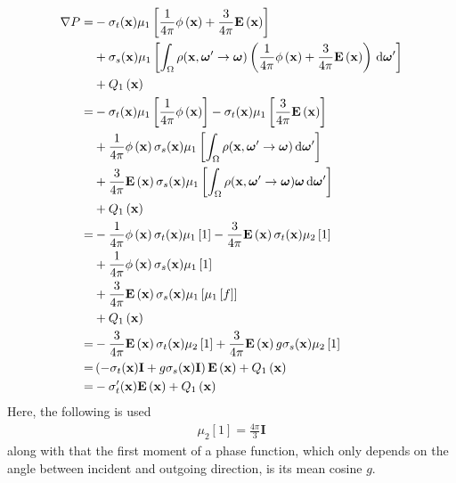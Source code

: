 \begin{align*}
\nabla P =&
-\sigma_t(\boldsymbol{\mathbf{x}})\mu_1\left[\frac{1}{4\pi}\phi\left(\boldsymbol{\mathbf{x}}\right) + \frac{3}{4\pi}\boldsymbol{\mathbf{E}}\left(\boldsymbol{\mathbf{x}}\right)\right]
\\&
+\sigma_s(\boldsymbol{\mathbf{x}})\mu_1\left[\int_{\Omega}\rho(\boldsymbol{\mathbf{x}}, \boldsymbol{\mathbf{\omega}}'\rightarrow\boldsymbol{\mathbf{\omega}})\left(\frac{1}{4\pi}\phi\left(\boldsymbol{\mathbf{x}}\right) + \frac{3}{4\pi}\boldsymbol{\mathbf{E}}\left(\boldsymbol{\mathbf{x}}\right)\right)\,\mathrm{d}\boldsymbol{\mathbf{\omega}}'\right]
\\&
\nonumber
+ Q_1\left(\boldsymbol{\mathbf{x}}\right)
\\
=&
-\sigma_t(\boldsymbol{\mathbf{x}})\mu_1\left[\frac{1}{4\pi}\phi\left(\boldsymbol{\mathbf{x}}\right)\right]
-\sigma_t(\boldsymbol{\mathbf{x}})\mu_1\left[\frac{3}{4\pi}\boldsymbol{\mathbf{E}}\left(\boldsymbol{\mathbf{x}}\right)\right]
\\
&
+\frac{1}{4\pi}\phi\left(\boldsymbol{\mathbf{x}}\right)\sigma_s(\boldsymbol{\mathbf{x}})\mu_1\left[\int_{\Omega}\rho(\boldsymbol{\mathbf{x}}, \boldsymbol{\mathbf{\omega}}'\rightarrow\boldsymbol{\mathbf{\omega}})\,\mathrm{d}\boldsymbol{\mathbf{\omega}}'\right]
\\
&
+\frac{3}{4\pi}\boldsymbol{\mathbf{E}}\left(\boldsymbol{\mathbf{x}}\right)\sigma_s(\boldsymbol{\mathbf{x}})\mu_1\left[\int_{\Omega}\rho(\boldsymbol{\mathbf{x}}, \boldsymbol{\mathbf{\omega}}'\rightarrow\boldsymbol{\mathbf{\omega}})\boldsymbol{\mathbf{\omega}}\,\mathrm{d}\boldsymbol{\mathbf{\omega}}'\right]
\\
&
+Q_1\left(\boldsymbol{\mathbf{x}}\right)
\\
=&
-\frac{1}{4\pi}\phi\left(\boldsymbol{\mathbf{x}}\right)\sigma_t(\boldsymbol{\mathbf{x}})\mu_1\left[1\right]
-\frac{3}{4\pi}\boldsymbol{\mathbf{E}}\left(\boldsymbol{\mathbf{x}}\right)\sigma_t(\boldsymbol{\mathbf{x}})\mu_2\left[1\right]
\\
&
+\frac{1}{4\pi}\phi\left(\boldsymbol{\mathbf{x}}\right)\sigma_s(\boldsymbol{\mathbf{x}})\mu_1\left[1\right]
\\
&
+\frac{3}{4\pi}\boldsymbol{\mathbf{E}}\left(\boldsymbol{\mathbf{x}}\right)\sigma_s(\boldsymbol{\mathbf{x}})\mu_1\left[\mu_1\left[f\right]\right]
\\
&
+Q_1\left(\boldsymbol{\mathbf{x}}\right)
\\
=&
-\frac{3}{4\pi}\boldsymbol{\mathbf{E}}\left(\boldsymbol{\mathbf{x}}\right)\sigma_t(\boldsymbol{\mathbf{x}})\mu_2\left[1\right]
+\frac{3}{4\pi}\boldsymbol{\mathbf{E}}\left(\boldsymbol{\mathbf{x}}\right)g\sigma_s(\boldsymbol{\mathbf{x}})\mu_2\left[1\right]
\\
=&
\left(-\sigma_t(\boldsymbol{\mathbf{x}})\mathbf{I} + g\sigma_s(\boldsymbol{\mathbf{x}})\mathbf{I}\right)\boldsymbol{\mathbf{E}}\left(\boldsymbol{\mathbf{x}}\right)
+Q_1\left(\boldsymbol{\mathbf{x}}\right)
\\
=&
-\sigma_t'(\boldsymbol{\mathbf{x}})\boldsymbol{\mathbf{E}}\left(\boldsymbol{\mathbf{x}}\right)
+Q_1\left(\boldsymbol{\mathbf{x}}\right)
\end{align*}
Here, the following is used
\begin{align*}
\mu_2[1] = \frac{4\pi}{3}\mathbf{I}
\end{align*}
along with that the first moment of a phase function, which only depends on the angle between incident and outgoing direction, is its mean cosine $g$.

